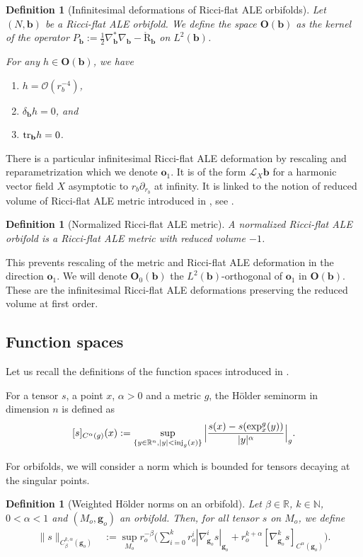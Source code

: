 \documentclass[12pt]{article}
\newtheorem{defn}[thm]{Definition}
\begin{document}
\begin{defn}[Infinitesimal deformations of Ricci-flat ALE orbifolds]
    Let $(N,\mathbf{b})$ be a Ricci-flat ALE orbifold. We define the space $\mathbf{O}(\mathbf{b})$ as the kernel of the operator $P_{\mathbf{b}}:= \frac{1}{2}\nabla_{\mathbf{b}}^*\nabla_{\mathbf{b}} - \mathring{\mathrm{R}}_{\mathbf{b}}$ on $L^2(\mathbf{b})$.
    
    For any $h\in \mathbf{O}(\mathbf{b})$, we have
    \begin{enumerate}
        \item $h = \mathcal{O}(r_b^{-4})$,
        \item $\delta_{\mathbf{b}}h=0$, and
        \item $ \textup{tr}_{\mathbf{b}}h=0 $.
    \end{enumerate}
\end{defn}
There is a particular infinitesimal Ricci-flat ALE deformation by rescaling and reparametrization which we denote $\mathbf{o}_1$. It is of the form $\mathcal{L}_{X}\mathbf{b}$ for a harmonic vector field $X$ asymptotic to $r_b\partial_{r_b}$ at infinity. It is linked to the notion of reduced volume of Ricci-flat ALE metric introduced in \cite{bh}, see \cite{ozu4}.
\begin{defn}[Normalized Ricci-flat ALE metric]
    A \emph{normalized Ricci-flat ALE orbifold} is a Ricci-flat ALE metric with reduced volume $-1$. 
\end{defn}
This prevents rescaling of the metric and Ricci-flat ALE deformation in the direction $\mathbf{o}_1$. We will denote $\mathbf{O}_0(\mathbf{b})$ the $L^2(\mathbf{b})$-orthogonal of $ \mathbf{o}_1 $ in $\mathbf{O}(\mathbf{b})$. These are the infinitesimal Ricci-flat ALE deformations preserving the reduced volume at first order.

    \subsection{Function spaces}
    Let us recall the definitions of the function spaces introduced in \cite{ozu2}.
    
    For a tensor $s$, a point $x$, $\alpha>0$ and a metric $g$, the Hölder seminorm in dimension $n$ is defined as
$$ [s]_{C^\alpha(g)}(x):= \sup_{\{y\in \mathbb{R}^n,|y|< \textup{inj}_g(x)\}} \Big| \frac{s(x)-s(\exp^g_x(y))}{|y|^\alpha} \Big|_g.$$

For orbifolds, we will consider a norm which is bounded for tensors decaying at the singular points.
\begin{defn}[Weighted Hölder norms on an orbifold]
    Let $\beta\in \mathbb{R}$, $k\in\mathbb{N}$, $0<\alpha<1$ and $(M_o,\mathbf{g}_o)$ an orbifold. Then, for all tensor $s$ on $M_o$, we define
    \begin{align*}
        \| s \|_{C^{k,\alpha}_{\beta}(\mathbf{g}_o)} &:= \sup_{M_o}r_o^{-\beta}\Big(\sum_{i=0}^k r_o^{i}|\nabla_{\mathbf{g}_o}^i s|_{\mathbf{g}_o} + r_o^{k+\alpha}[\nabla_{\mathbf{g}_o}^ks]_{C^\alpha(\mathbf{g}_o)}\Big).
    \end{align*}
\end{defn}
\end{document}
